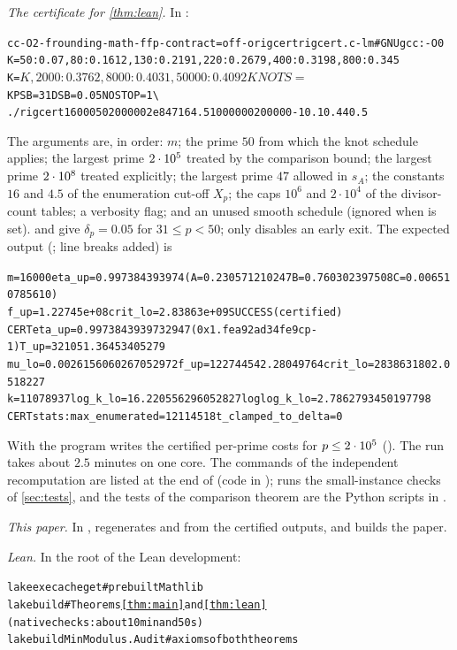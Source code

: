 \emph{The certificate for \cref{thm:lean}.} In :
\begin{alltt}\footnotesize
cc -O2 -frounding-math -ffp-contract=off -o rigcert rigcert.c -lm   # GNU gcc: -O0
K=50:0.07,80:0.1612,130:0.2191,220:0.2679,400:0.3198,800:0.345
K=$K,2000:0.3762,8000:0.4031,50000:0.4092
KNOTS=$K PSB=31 DSB=0.05 NOSTOP=1 \textbackslash
  ./rigcert 16000 50 200000 2e8 47 16 4.5 1000000 20000 0 -1 0.1 0.44 0.5
\end{alltt}
The arguments are, in order: $m$; the prime $50$ from which the knot schedule applies; the largest prime $2\cdot 10^{5}$
treated by the comparison bound; the largest prime $2\cdot 10^{8}$ treated explicitly; the largest prime $47$ allowed in
$s_A$; the constants $16$ and $4.5$ of the enumeration cut-off $X_p$; the caps $10^6$ and $2\cdot10^4$ of the
divisor-count tables; a verbosity flag; and an unused smooth schedule (ignored when  is set).
 and  give $\delta_p=0.05$ for $31\le p<50$;  only disables an early exit. The
expected output (; line breaks added) is
\begin{alltt}\footnotesize
m=16000 eta_up=0.997384393974 (A=0.230571210247 B=0.760302397508 C=0.006510785610)
  f_up=1.22745e+08 crit_lo=2.83863e+09 SUCCESS(certified)
CERT eta_up=0.9973843939732947 (0x1.fea92ad34fe9cp-1) T_up=321051.36453405279
  mu_lo=0.0026156060267052972 f_up=122744542.28049764 crit_lo=2838631802.0518227
  k=11078937 log_k_lo=16.220556296052827 loglog_k_lo=2.7862793450197798
CERT stats: max_enumerated=12114518 t_clamped_to_delta=0
\end{alltt}
With  the program writes the certified per-prime costs for $p\le2\cdot 10^{5}$ ().
The run takes about $2.5$ minutes on one core. The commands of the independent recomputation are listed at the end
of  (code in );  runs the
small-instance checks of \cref{sec:tests}, and the tests of the comparison theorem are the Python scripts in
.

\emph{This paper.} In ,  regenerates  and  from the
certified outputs, and  builds the paper.

\emph{Lean.} In the root of the Lean development:
\begin{alltt}\footnotesize
lake exe cache get              # prebuilt Mathlib
lake build                      # Theorems \ref{thm:main} and \ref{thm:lean} (native checks: about 10 min and 50 s)
lake build MinModulus.Audit     # axioms of both theorems
\end{alltt}
